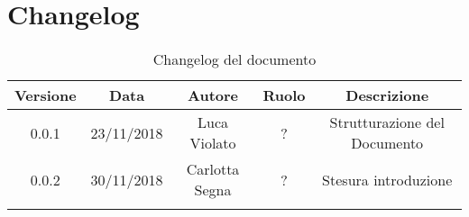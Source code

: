 \section{Changelog}

\begin{center}
\begin{longtable}{|c|c|c|c|c|}
\hline
\textbf{Versione} & \textbf{Data} & \textbf{Autore} & \textbf{Ruolo} & \textbf{Descrizione} \\
\hline \hline
\endfirsthead
0.0.1 & 23/11/2018 & Luca Violato & ? & Strutturazione del Documento \\
0.0.2 & 30/11/2018 & Carlotta Segna & ? & Stesura introduzione \\
\hline
\caption{Changelog del documento}
\end{longtable}
\end{center}